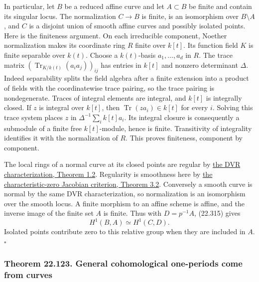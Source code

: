 \documentclass[
  11pt,
  a4paper,
]{article}
\begin{document}
In particular, let \(B\) be a reduced affine curve and let
\(A\subset B\) be finite and contain its singular locus. The
normalization \(C\to B\) is finite, is an isomorphism over
\(B\setminus A\), and \(C\) is a disjoint union of smooth affine curves
and possibly isolated points. Here is the finiteness argument. On each
irreducible component, Noether normalization makes its coordinate ring
\(R\) finite over \(k[t]\). Its function field \(K\) is finite separable
over \(k(t)\). Choose a \(k(t)\)-basis \(a_1,\ldots,a_d\) in \(R\). The
trace matrix \((\operatorname{Tr}_{K/k(t)}(a_i a_j))_{ij}\) has entries
in \(k[t]\) and nonzero determinant \(\Delta\). Indeed separability
splits the field algebra after a finite extension into a product of
fields with the coordinatewise trace pairing, so the trace pairing is
nondegenerate. Traces of integral elements are integral, and \(k[t]\) is
integrally closed. If \(z\) is integral over \(k[t]\), then
\(\operatorname{Tr}(z a_i)\in k[t]\) for every \(i\). Solving this trace
system places \(z\) in \(\Delta^{-1}\sum_i k[t]a_i\). Its integral
closure is consequently a submodule of a finite free \(k[t]\)-module,
hence is finite. Transitivity of integrality identifies it with the
normalization of \(R\). This proves finiteness, component by component.

The local rings of a normal curve at its closed points are regular by
\href{https://kokunoyumeto.github.io/open-math-courses-public/courses/AG-CA/AG-CA-15.html\#1-a-single-parameter-and-a-discrete-valuation}{the
DVR characterization, Theorem 1.2}. Regularity is smoothness here by
\href{https://kokunoyumeto.github.io/open-math-courses-public/courses/AG-CA/AG-CA-18.html\#3-cotangent-spaces-and-separable-residue-fields}{the
characteristic-zero Jacobian criterion, Theorem 3.2}. Conversely a
smooth curve is normal by the same DVR characterization, so
normalization is an isomorphism over the smooth locus. A finite morphism
to an affine scheme is affine, and the inverse image of the finite set
\(A\) is finite. Thus with \(D=p^{-1}A\), (22.315) gives \[
 H^1(B,A)\simeq H^1(C,D).
 \tag{22.317}
\] Isolated points contribute zero to this relative group when they are
included in \(A\). \(\square\)

\subsubsection{Theorem 22.123. General cohomological one-periods come
from
curves}\label{theorem-22.123.-general-cohomological-one-periods-come-from-curves}
\end{document}
